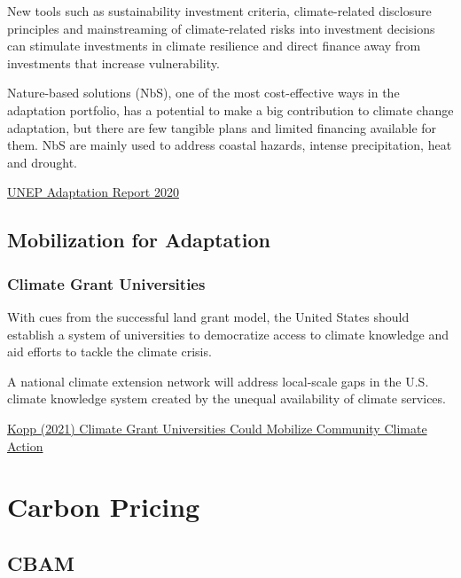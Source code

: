 \documentclass[
]{book}
\begin{document}
New tools such as sustainability investment criteria, climate-related disclosure principles
and mainstreaming of climate-related risks into investment decisions can stimulate investments in
climate resilience and direct finance away from investments that increase vulnerability.

Nature-based solutions (NbS), one of the most cost-effective ways in the adaptation portfolio, has
a potential to make a big contribution to climate change adaptation, but there are few tangible
plans and limited financing available for them.
NbS are mainly used to address coastal hazards, intense precipitation, heat and
drought.

\href{https://www.unep.org/resources/adaptation-gap-report-2020}{UNEP Adaptation Report 2020}

\hypertarget{mobilization-for-adaptation}{%
\section{Mobilization for Adaptation}\label{mobilization-for-adaptation}}

\hypertarget{climate-grant-universities}{%
\subsection{Climate Grant Universities}\label{climate-grant-universities}}

With cues from the successful land grant model, the United States should establish a system of universities to democratize access to climate knowledge and aid efforts to tackle the climate crisis.

A national climate extension network will address local-scale gaps in the U.S. climate knowledge system created by the unequal availability of climate services.

\href{https://eos.org/opinions/climate-grant-universities-could-mobilize-community-climate-action}{Kopp (2021) Climate Grant Universities Could Mobilize Community Climate Action}

\hypertarget{carbon-pricing}{%
\chapter{Carbon Pricing}\label{carbon-pricing}}

\hypertarget{cbam}{%
\section{CBAM}\label{cbam}}
\end{document}
